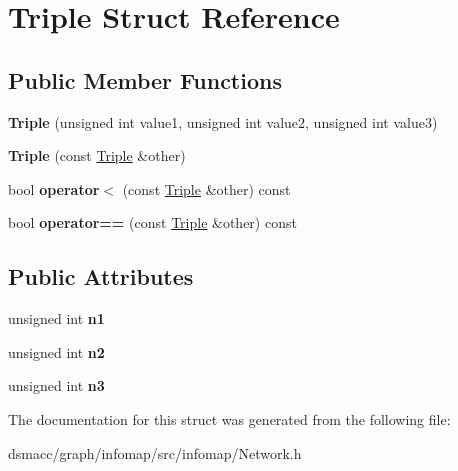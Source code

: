 \hypertarget{structTriple}{}\section{Triple Struct Reference}
\label{structTriple}
\subsection*{Public Member Functions}
\begin{DoxyCompactItemize}
\item 
\mbox{\label{structTriple_a3404bdaa630f993b17c48d57d6b77c91}} 
{\bfseries Triple} (unsigned int value1, unsigned int value2, unsigned int value3)
\item 
\mbox{\label{structTriple_add2cbdbf68dfa30c1fb842706c0d6fd9}} 
{\bfseries Triple} (const \mbox{\hyperlink{structTriple}{Triple}} \&other)
\item 
\mbox{\label{structTriple_adcbe0881e392af452815e63ad8bb6de9}} 
bool {\bfseries operator$<$} (const \mbox{\hyperlink{structTriple}{Triple}} \&other) const
\item 
\mbox{\label{structTriple_a8e8800538834c179479a044922bd9d58}} 
bool {\bfseries operator==} (const \mbox{\hyperlink{structTriple}{Triple}} \&other) const
\end{DoxyCompactItemize}
\subsection*{Public Attributes}
\begin{DoxyCompactItemize}
\item 
\mbox{\label{structTriple_a68552a2d6d3af2ac34c8ea372f87b636}} 
unsigned int {\bfseries n1}
\item 
\mbox{\label{structTriple_ac0d8e948792208e9835b75203fa492bf}} 
unsigned int {\bfseries n2}
\item 
\mbox{\label{structTriple_af7f4cf59bd22ab02993c7af9a5247f7d}} 
unsigned int {\bfseries n3}
\end{DoxyCompactItemize}


The documentation for this struct was generated from the following file\+:\begin{DoxyCompactItemize}
\item 
dsmacc/graph/infomap/src/infomap/Network.\+h\end{DoxyCompactItemize}
